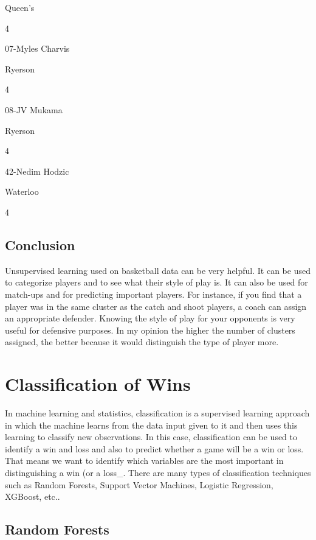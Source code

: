 \documentclass[]{book}
\begin{document}
Queen's

4

07-Myles Charvis

Ryerson

4

08-JV Mukama

Ryerson

4

42-Nedim Hodzic

Waterloo

4

\hypertarget{conclusion-1}{%
\section{Conclusion}\label{conclusion-1}}

Unsupervised learning used on basketball data can be very helpful. It can be used to categorize players and to see what their style of play is. It can also be used for match-ups and for predicting important players. For instance, if you find that a player was in the same cluster as the catch and shoot players, a coach can assign an appropriate defender. Knowing the style of play for your opponents is very useful for defensive purposes. In my opinion the higher the number of clusters assigned, the better because it would distinguish the type of player more.

\hypertarget{classification-of-wins}{%
\chapter{Classification of Wins}\label{classification-of-wins}}

In machine learning and statistics, classification is a supervised learning approach in which the machine learns from the data input given to it and then uses this learning to classify new observations. In this case, classification can be used to identify a win and loss and also to predict whether a game will be a win or loss. That means we want to identify which variables are the most important in distinguishing a win (or a loss\_.
There are many types of classification techniques such as Random Forests, Support Vector Machines, Logistic Regression, XGBoost, etc..

\hypertarget{random-forests}{%
\section{Random Forests}\label{random-forests}}
\end{document}
